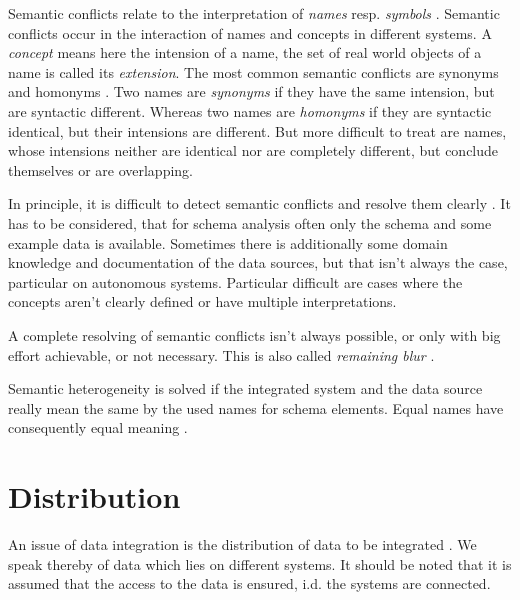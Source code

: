 Semantic conflicts relate to the interpretation of \emph{names} resp. \emph{symbols} \cite[p. 74]{DBLP:books/dp/LeserN2006}. 
Semantic conflicts occur in the interaction of names and concepts in different systems. A \textit{concept} means here the intension of a name, the set of real world objects of a name is called its \emph{extension}. 
The most common semantic conflicts are synonyms and homonyms \cite[p. 75]{DBLP:books/dp/LeserN2006}. 
Two names are \textit{synonyms} if they have the same intension, but are syntactic different. 
Whereas two names are \textit{homonyms} if they are syntactic identical, but their intensions are different. But more difficult to treat are names, whose intensions neither are identical nor are completely different, but conclude themselves or are overlapping.

In principle, it is difficult to detect semantic conflicts and resolve them clearly \cite[p. 76]{DBLP:books/dp/LeserN2006}. 
It has to be considered, that for schema analysis often only the schema and some example data is available. Sometimes there is additionally some domain knowledge and documentation of the data sources, but that isn't always the case, particular on autonomous systems. Particular difficult are cases where the concepts aren't clearly defined or have multiple interpretations. 

A complete resolving of semantic conflicts isn't always possible, or only with big effort achievable, or not necessary. This is also called \textit{remaining blur} \cite[p. 76]{DBLP:books/dp/LeserN2006}.

Semantic heterogeneity is solved if the integrated system and the data source really mean the same by the used names for schema elements. Equal names have consequently equal meaning \cite[p. 61]{DBLP:books/dp/LeserN2006}.

\section{Distribution}

An issue of data integration is the distribution of data to be integrated \cite[p. 51]{DBLP:books/dp/LeserN2006}. We speak thereby of data which lies on different systems. It should be noted that it is assumed that the access to the data is ensured, i.d. the systems are connected. 

